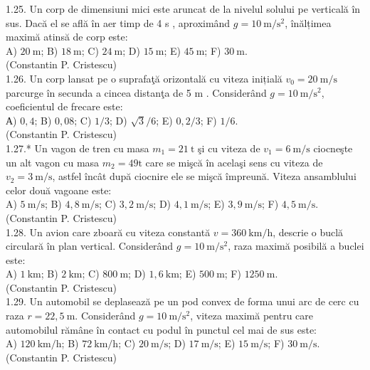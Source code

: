 \documentclass[10pt]{article}
\begin{document}
1.25. Un corp de dimensiuni mici este aruncat de la nivelul solului pe verticală în sus. Dacă el se află în aer timp de 4 s , aproximând $g=10 \mathrm{~m} / \mathrm{s}^{2}$, înălțimea maximă atinsă de corp este:\\ A) $20 \mathrm{~m}$; B) $18 \mathrm{~m}$; C) $24 \mathrm{~m}$; D) $15 \mathrm{~m}$; E) $45 \mathrm{~m}$; F) $30 \mathrm{~m}$.\\ (Constantin P. Cristescu)\\

1.26. Un corp lansat pe o suprafaţă orizontală cu viteza inițială $v_{0}=20 \mathrm{~m} / \mathrm{s}$ parcurge în secunda a cincea distanţa de 5 m . Considerând $g=10 \mathrm{~m} / \mathrm{s}^{2}$, coeficientul de frecare este:\\ А) $0,4$; B) $0,08$; C) $1 / 3$; D) $\sqrt{3} / 6$; E) $0,2 / 3$; F) $1 / 6$.\\ (Constantin P. Cristescu)\\

1.27.* Un vagon de tren cu masa $m_{1}=21 \mathrm{~t}$ şi cu viteza de $v_{1}=6 \mathrm{~m} / \mathrm{s}$ ciocneşte un alt vagon cu masa $m_{2}=49 \mathrm{t}$ care se mişcă în acelaşi sens cu viteza de $v_{2}=3 \mathrm{~m} / \mathrm{s}$, astfel încât după ciocnire ele se mişcă împreună. Viteza ansamblului celor două vagoane este:\\ A) $5 \mathrm{~m} / \mathrm{s}$; B) $4,8 \mathrm{~m} / \mathrm{s}$; C) $3,2 \mathrm{~m} / \mathrm{s}$; D) $4,1 \mathrm{~m} / \mathrm{s}$; E) $3,9 \mathrm{~m} / \mathrm{s}$; F) $4,5 \mathrm{~m} / \mathrm{s}$.\\ (Constantin P. Cristescu)\\

1.28. Un avion care zboară cu viteza constantă $v=360 \mathrm{~km} / \mathrm{h}$, descrie o buclă circulară în plan vertical. Considerând $g=10 \mathrm{~m} / \mathrm{s}^{2}$, raza maximă posibilă a buclei este:\\ A) $1 \mathrm{~km}$; B) $2 \mathrm{~km}$; C) $800 \mathrm{~m}$; D) $1,6 \mathrm{~km}$; E) $500 \mathrm{~m}$; F) $1250 \mathrm{~m}$.\\ (Constantin P. Cristescu)\\

1.29. Un automobil se deplasează pe un pod convex de forma unui arc de cerc cu raza $r=22,5 \mathrm{~m}$. Considerând $g=10 \mathrm{~m} / \mathrm{s}^{2}$, viteza maximă pentru care automobilul rămâne în contact cu podul în punctul cel mai de sus este:\\ A) $120 \mathrm{~km} / \mathrm{h}$; B) $72 \mathrm{~km} / \mathrm{h}$; C) $20 \mathrm{~m} / \mathrm{s}$; D) $17 \mathrm{~m} / \mathrm{s}$; E) $15 \mathrm{~m} / \mathrm{s}$; F) $30 \mathrm{~m} / \mathrm{s}$.\\ (Constantin P. Cristescu)\\
\end{document}
